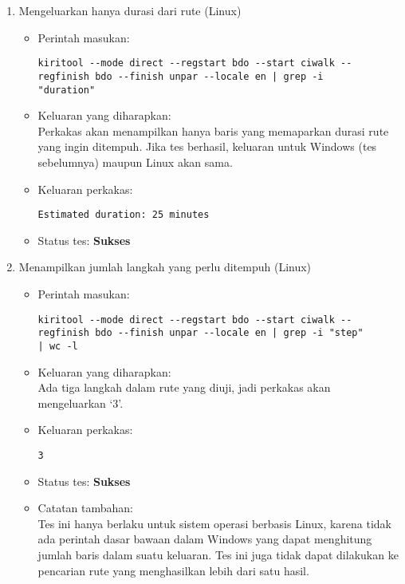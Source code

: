 \begin{enumerate}
	\item Mengeluarkan hanya durasi dari rute (Linux)
	\begin{itemize}
		\item Perintah masukan:
		\begin{lstlisting}
kiritool --mode direct --regstart bdo --start ciwalk --regfinish bdo --finish unpar --locale en | grep -i
"duration"
		\end{lstlisting}
		\item Keluaran yang diharapkan: \\
		Perkakas akan menampilkan hanya baris yang memaparkan durasi rute yang ingin ditempuh. Jika tes berhasil, keluaran untuk Windows (tes sebelumnya) maupun Linux akan sama.
		\item Keluaran perkakas:
		\begin{lstlisting}
Estimated duration: 25 minutes
		\end{lstlisting}
		\item Status tes: \textbf{Sukses}
	\end{itemize}
	
	\item Menampilkan jumlah langkah yang perlu ditempuh (Linux)
	\begin{itemize}
		\item Perintah masukan:
		\begin{lstlisting}
kiritool --mode direct --regstart bdo --start ciwalk --regfinish bdo --finish unpar --locale en | grep -i "step"
| wc -l
		\end{lstlisting}
		\item Keluaran yang diharapkan: \\
Ada tiga langkah dalam rute yang diuji, jadi perkakas akan mengeluarkan `3'.
		\item Keluaran perkakas:
		\begin{lstlisting}
3
		\end{lstlisting}
		\item Status tes: \textbf{Sukses}
		\item Catatan tambahan: \\
		Tes ini hanya berlaku untuk sistem operasi berbasis Linux, karena tidak ada perintah dasar bawaan dalam \cl\xspace Windows yang dapat menghitung jumlah baris dalam suatu keluaran. Tes ini juga tidak dapat dilakukan ke pencarian rute yang menghasilkan lebih dari satu hasil.
	\end{itemize}
	
\end{enumerate}
